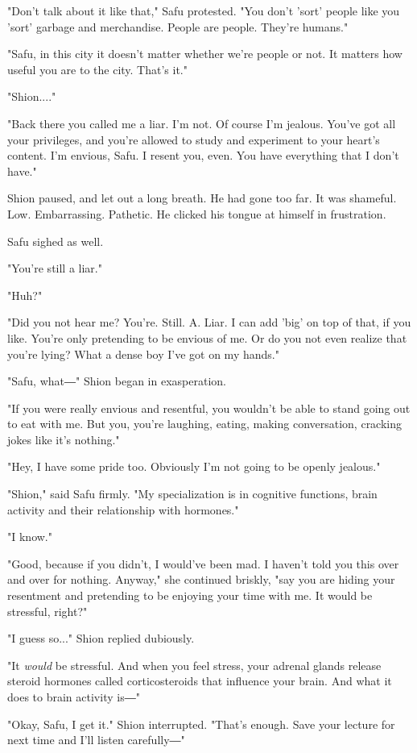 "Don't talk about it like that," Safu protested. "You don't 'sort'
people like you 'sort' garbage and merchandise. People are people.
They're humans."

"Safu, in this city it doesn't matter whether we're people or not. It
matters how useful you are to the city. That's it."

"Shion...."

"Back there you called me a liar. I'm not. Of course I'm jealous. You've
got all your privileges, and you're allowed to study and experiment to
your heart's content. I'm envious, Safu. I resent you, even. You have
everything that I don't have."

Shion paused, and let out a long breath. He had gone too far. It was
shameful. Low. Embarrassing. Pathetic. He clicked his tongue at himself
in frustration.

Safu sighed as well.

"You're still a liar."

"Huh?"

"Did you not hear me? You're. Still. A. Liar. I can add 'big' on top of
that, if you like. You're only pretending to be envious of me. Or do you
not even realize that you're lying? What a dense boy I've got on my
hands."

"Safu, what―" Shion began in exasperation.

"If you were really envious and resentful, you wouldn't be able to stand
going out to eat with me. But you, you're laughing, eating, making
conversation, cracking jokes like it's nothing."

"Hey, I have some pride too. Obviously I'm not going to be openly
jealous."

"Shion," said Safu firmly. "My specialization is in cognitive functions,
brain activity and their relationship with hormones."

"I know."

"Good, because if you didn't, I would've been mad. I haven't told you
this over and over for nothing. Anyway," she continued briskly, "say you
are hiding your resentment and pretending to be enjoying your time with
me. It would be stressful, right?"

"I guess so..." Shion replied dubiously.

"It \emph{would} be stressful. And when you feel stress, your adrenal glands
release steroid hormones called corticosteroids that influence your
brain. And what it does to brain activity is―"

"Okay, Safu, I get it." Shion interrupted. "That's enough. Save your
lecture for next time and I'll listen carefully―"

